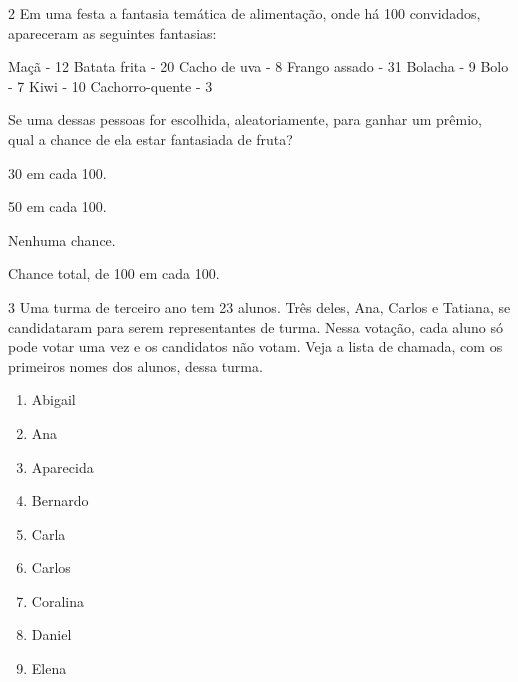 \begin{multicols}{2}
\num{2} Em uma festa a fantasia temática de alimentação, onde há 100 convidados, apareceram as seguintes fantasias:

Maçã - 12
Batata frita - 20
Cacho de uva - 8
Frango assado - 31
Bolacha - 9
Bolo - 7
Kiwi - 10
Cachorro-quente - 3

Se uma dessas pessoas for escolhida, aleatoriamente, para ganhar um prêmio, qual a chance de ela estar fantasiada de fruta?

\begin{minipage}{.5\textwidth}
\begin{escolha}
\item
30 em cada 100.
\item
50 em cada 100.
\item
Nenhuma chance.
\item
Chance total, de 100 em cada 100.
\end{escolha}
\end{minipage}



\num{3} Uma turma de terceiro ano tem 23 alunos. Três deles, Ana, Carlos e Tatiana, se candidataram para serem representantes de turma. Nessa votação, cada aluno só pode votar uma vez e os candidatos não votam. Veja a lista de chamada, com os primeiros nomes dos alunos, dessa turma.

\begin{enumerate}
\item Abigail

\item Ana

\item Aparecida

\item Bernardo

\item Carla

\item Carlos

\item Coralina

\item Daniel 

\item Elena


\end{enumerate}
\end{multicols}

